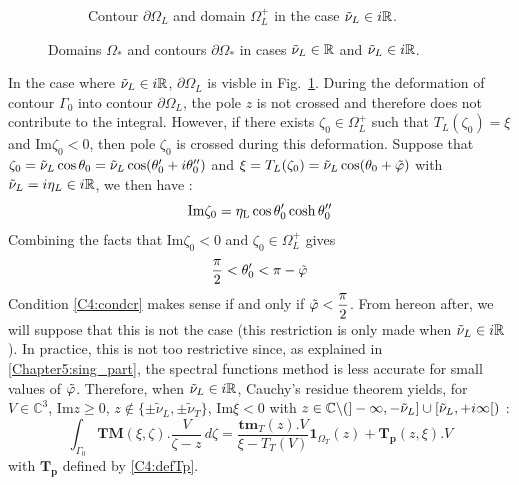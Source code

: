 \begin{figure}
\begin{subfigure}[b]{0.45\textwidth}
\caption{Contour $\partial \Omega_L$ and domain $\Omega_L^+$ in the case $\tilde{\nu}_L \in i\mathbb{R}$.}
\label{C4:domegaL}
\end{subfigure}
\caption{Domains $\Omega_*$ and contours $\partial \Omega_*$ in cases $\tilde{\nu}_L \in \mathbb{R}$ and $\tilde{\nu}_L \in i\mathbb{R}$.}
\label{C4:domega0}
\end{figure}

In the case where $\tilde{\nu}_L \in i\mathbb{R}$, $\partial \Omega_L$ is visble in Fig.~\ref{C4:domegaL}. During the deformation of contour $\Gamma_0$ into contour $\partial\Omega_L$, the pole $z$ is not crossed  and therefore does not contribute to the integral. However, if there exists $\zeta_0 \in \Omega_L^+$ such that $T_L(\zeta_0)=\xi$ and Im$\zeta_0<0$, then pole $\zeta_0$ is crossed during this deformation. Suppose that $\zeta_0=\tilde{\nu}_L\cos\theta_0=\tilde{\nu}_L\cos(\theta_0'+i\theta_0'')$ and $\xi=T_L(\zeta_0)=\tilde{\nu}_L\cos(\theta_0+\tilde{\varphi})$ with $\tilde{\nu}_L=i\eta_L \in i\mathbb{R}$, we then have :
\begin{equation}
\rm Im \zeta_0=\eta_L\cos\theta_0'\cosh\theta_0''  
\end{equation}
Combining the facts that Im$\zeta_0<0$ and $\zeta_0 \in \Omega_L^+$ gives
\begin{equation}
\dfrac{\pi}{2}<\theta_0'<\pi-\tilde{\varphi}
\label{C4:condcr}
\end{equation}
Condition \eqref{C4:condcr} makes sense if and only if $\tilde{\varphi}<\dfrac{\pi}{2}$. From hereon after, we will suppose that this is not the case (this restriction is only made when $\tilde{\nu}_L \in i\mathbb{R}$). In practice, this is not too restrictive since, as explained in \ref{Chapter5:sing_part}, the spectral functions method is less accurate for small values of $\tilde{\varphi}$. Therefore, when $\tilde{\nu}_L \in i\mathbb{R}$, Cauchy's residue theorem yields, for $V \in \mathbb{C}^3$, Im$z\geq 0, \, z \notin \{\pm\tilde{\nu}_L,\pm\tilde{\nu}_T \}$, Im$\xi <0 $ with $z\in \mathbb{C} \backslash ( \rbrack - \infty, -\tilde{\nu}_L \rbrack\cup \lbrack \tilde{\nu}_L,+i\infty\lbrack)$ :
\begin{equation}
\int_{\Gamma_0} \textbf{TM}(\xi,\zeta).\frac{V}{\zeta-z}\,d\zeta = \frac{\textbf{tm}_T(z).V}{\xi-T_T(V)}\textbf{1}_{\Omega_T}(z)+\mathbf{T_p}(z,\xi).V
\label{C4:GaussTMcr}
\end{equation}
with $\mathbf{T_p}$ defined by \eqref{C4:defTp}.


